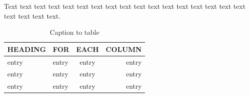 \documentclass{iucr}              %
\begin{document}
Text text text text text text text text text text text text text text
text text text text text text text.






\cite{knuth84}





\begin{table}
\caption{Caption to table}
\begin{tabular}{llcr}      %
 HEADING    & FOR        & EACH       & COLUMN     \\
\hline
 entry      & entry      & entry      & entry      \\
 entry      & entry      & entry      & entry      \\
 entry      & entry      & entry      & entry      \\
\end{tabular}
\end{table}

\end{document}
